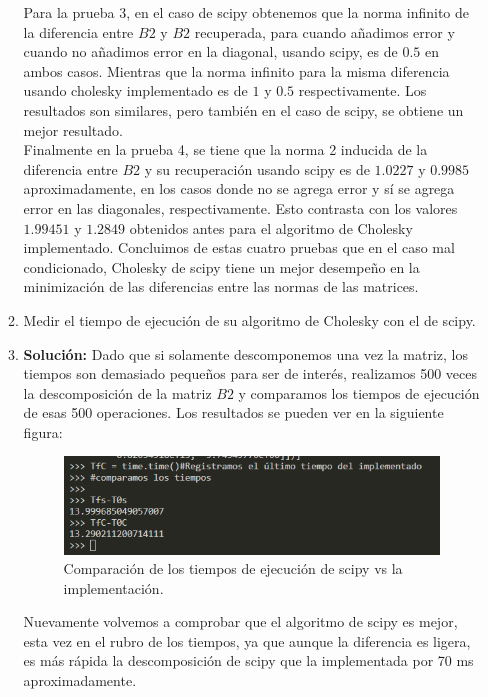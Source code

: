 \documentclass[letterpaper]{article}
\newcommand{\1}{\mathds{1}}
\theoremstyle{definition}
\theoremstyle{definition}
\theoremstyle{definition}
\theoremstyle{definition}
\theoremstyle{definition}
\begin{document}
\begin{enumerate}
\begin{enumerate}
        Para la prueba 3, en el caso de scipy obtenemos que la norma infinito de la diferencia entre $B2$ y $B2$ recuperada, para
        cuando añadimos error y cuando no añadimos error en la diagonal, usando scipy, es de $0.5$ en ambos casos. Mientras que
        la norma infinito para la misma diferencia usando cholesky implementado es de $1$ y $0.5$ respectivamente. Los resultados
        son similares, pero también en el caso de scipy, se obtiene un mejor resultado.\\

        Finalmente en la prueba 4, se tiene que la norma 2 inducida de la diferencia entre $B2$ y su recuperación usando scipy es
        de $1.0227$ y $0.9985$ aproximadamente, en los casos donde no se agrega error y sí se agrega error en las diagonales, 
        respectivamente. Esto contrasta con los valores $1.99451$ y $1.2849$ obtenidos antes para el algoritmo de Cholesky implementado.
        Concluimos de estas cuatro pruebas que en el caso mal condicionado, Cholesky de scipy tiene un mejor desempeño en la minimización
        de las diferencias entre las normas de las matrices.

        \item Medir el tiempo de ejecución de su algoritmo de Cholesky con el de scipy.
        \item \textbf{Solución:} Dado que si solamente descomponemos una vez la matriz, los tiempos 
        son demasiado pequeños para ser de interés, realizamos 500 veces la descomposición de la matriz
        $B2$ y comparamos los tiempos de ejecución de esas 500 operaciones. Los resultados se pueden ver
        en la siguiente figura:

        \begin{figure}[h]
            \centering
            \includegraphics[width=0.7\linewidth]{5.png}
            \caption{Comparación de los tiempos de ejecución de scipy vs la implementación.}
        \end{figure}
        Nuevamente volvemos a comprobar que el algoritmo de scipy es mejor, esta vez en el rubro de los tiempos, ya que
        aunque la diferencia es ligera, es más rápida la descomposición de scipy que la implementada por 70 ms aproximadamente.
        \end{enumerate}


\end{enumerate}
\end{document}
